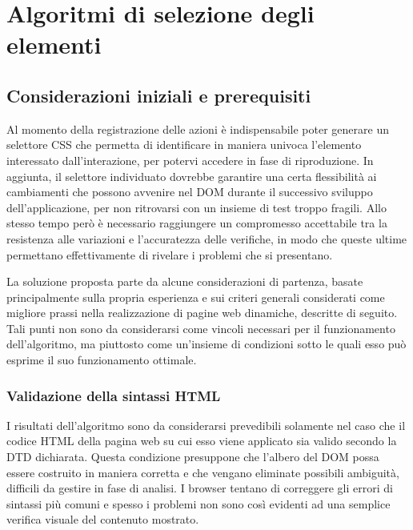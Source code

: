 \documentclass[12pt]{toptesi}
\begin{document}


\chapter{Algoritmi di selezione degli elementi}

\section{Considerazioni iniziali e prerequisiti}

Al momento della registrazione delle azioni è indispensabile poter generare un selettore CSS che permetta di identificare in maniera univoca l'elemento interessato dall'interazione, per potervi accedere in fase di riproduzione. In aggiunta, il selettore individuato dovrebbe garantire una certa flessibilità ai cambiamenti che possono avvenire nel DOM durante il successivo sviluppo dell'applicazione, per non ritrovarsi con un insieme di test troppo fragili.
Allo stesso tempo però è necessario raggiungere un compromesso accettabile tra la resistenza alle variazioni e l'accuratezza delle verifiche, in modo che queste ultime permettano effettivamente di rivelare i problemi che si presentano.

La soluzione proposta parte da alcune considerazioni di partenza, basate principalmente sulla propria esperienza e sui criteri generali considerati come migliore prassi nella realizzazione di pagine web dinamiche, descritte di seguito. Tali punti non sono da considerarsi come vincoli necessari per il funzionamento dell'algoritmo, ma piuttosto come un'insieme di condizioni sotto le quali esso può esprime il suo funzionamento ottimale. 

\subsection {Validazione della sintassi HTML}

I risultati dell'algoritmo sono da considerarsi prevedibili solamente nel caso che il codice HTML della pagina web su cui esso viene applicato sia valido secondo la DTD dichiarata. Questa condizione presuppone che l'albero del DOM possa essere costruito in maniera corretta e che vengano eliminate possibili ambiguità, difficili da gestire in fase di analisi. I browser tentano di correggere gli errori di sintassi più comuni e spesso i problemi non sono così evidenti ad una semplice verifica visuale del contenuto mostrato. 
\end{document}
